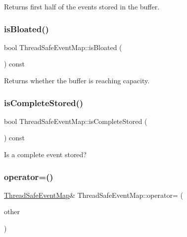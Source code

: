 Returns first half of the events stored in the buffer. 

\mbox{\label{class_thread_safe_event_map_a203143086874b97171101871ba2c4f6f}} 
\subsubsection{\texorpdfstring{is\+Bloated()}{isBloated()}}
{\footnotesize\ttfamily bool Thread\+Safe\+Event\+Map\+::is\+Bloated (\begin{DoxyParamCaption}{ }\end{DoxyParamCaption}) const\hspace{0.3cm}{\ttfamily [inline]}}



Returns whether the buffer is reaching capacity. 

\mbox{\label{class_thread_safe_event_map_a9fb58083137d147811de5b93f991d044}} 
\subsubsection{\texorpdfstring{is\+Complete\+Stored()}{isCompleteStored()}}
{\footnotesize\ttfamily bool Thread\+Safe\+Event\+Map\+::is\+Complete\+Stored (\begin{DoxyParamCaption}{ }\end{DoxyParamCaption}) const\hspace{0.3cm}{\ttfamily [inline]}}



Is a complete event stored? 

\mbox{\label{class_thread_safe_event_map_a1d438208fcc3936dd4384a8a2b55bdf8}} 
\subsubsection{\texorpdfstring{operator=()}{operator=()}\hspace{0.1cm}{\footnotesize\ttfamily [1/2]}}
{\footnotesize\ttfamily \hyperlink{class_thread_safe_event_map}{Thread\+Safe\+Event\+Map}\& Thread\+Safe\+Event\+Map\+::operator= (\begin{DoxyParamCaption}\item[{\hyperlink{class_thread_safe_event_map}{Thread\+Safe\+Event\+Map}}]{other }\end{DoxyParamCaption})\hspace{0.3cm}{\ttfamily [delete]}}

